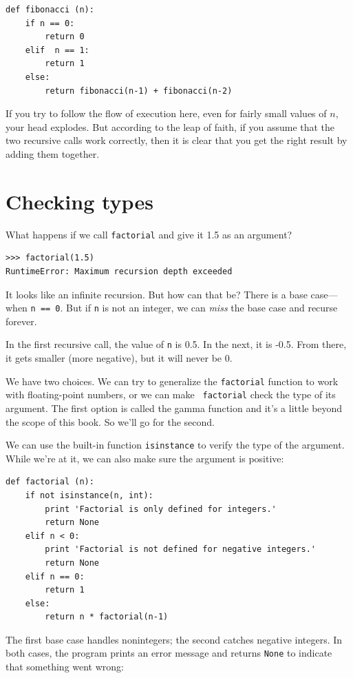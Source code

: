 \documentclass[10pt]{book}
\begin{document}
\begin{CJK}{UTF8}{gbsn}
\begin{verbatim}
def fibonacci (n):
    if n == 0:
        return 0
    elif  n == 1:
        return 1
    else:
        return fibonacci(n-1) + fibonacci(n-2)
\end{verbatim}
%
If you try to follow the flow of execution here, even for fairly
small values of $n$, your head explodes.  But according to the
leap of faith, if you assume that the two recursive calls
work correctly, then it is clear that you get
the right result by adding them together.


\section{Checking types}
\label{guardian}

What happens if we call {\tt factorial} and give it 1.5 as an argument?

\begin{verbatim}
>>> factorial(1.5)
RuntimeError: Maximum recursion depth exceeded
\end{verbatim}
%
It looks like an infinite recursion.  But how can that be?  There is a
base case---when {\tt n == 0}.  But if {\tt n} is not an integer,
we can {\em miss} the base case and recurse forever.

In the first recursive call, the value of {\tt n} is 0.5.
In the next, it is -0.5.  From there, it gets smaller
(more negative), but it will never be 0.

We have two choices.  We can try to generalize the {\tt factorial}
function to work with floating-point numbers, or we can make {\tt
  factorial} check the type of its argument.  The first option is
called the gamma function and it's a
little beyond the scope of this book.  So we'll go for the second.

We can use the built-in function {\tt isinstance} to verify the type
of the argument.  While we're at it, we can also make sure the
argument is positive:

\begin{verbatim}
def factorial (n):
    if not isinstance(n, int):
        print 'Factorial is only defined for integers.'
        return None
    elif n < 0:
        print 'Factorial is not defined for negative integers.'
        return None
    elif n == 0:
        return 1
    else:
        return n * factorial(n-1)
\end{verbatim}
%
The first base case handles nonintegers; the
second catches negative integers.  In both cases, the program prints
an error message and returns {\tt None} to indicate that something
went wrong:


\end{CJK}
\end{document}
